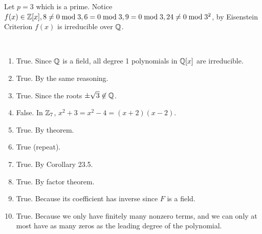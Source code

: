 \documentclass[class=article,crop=false]{standalone}
\begin{document}
\begin{problem}[23.19]
	Let $ p=3$ which is a prime. Notice  $ f(x) \in \mathbb{Z}[x], 8 \neq 0 \bmod 3, 6 = 0 \bmod 3, 9 = 0 \bmod 3, 24 \neq 0 \bmod 3^2$, by Eisenstein Criterion $ f(x)$ is irreducible over  $ \mathbb{Q}$.
\end{problem}

\begin{problem}[23.25]
	~\begin{enumerate}[label=\alph*)]
		\item True. Since $ \mathbb{Q}$ is a field, all degree 1 polynomials in $ \mathbb{Q}[x]$ are irreducible.
		\item True. By the same reasoning.
		\item True. Since the roots $\pm \sqrt{3} \not\in \mathbb{Q} $.
		\item False. In $ \mathbb{Z}_7$, $ x^2 + 3= x^2 -4 = (x+2)(x-2)$.
		\item True. By theorem.
		\item True (repeat).
		\item True. By Corollary 23.5.
		\item True. By factor theorem.
		\item True. Because its coefficient has inverse since $ F$ is a field.
		\item True. Because we only have finitely many nonzero terms, and we can only at most have as many zeros as the leading degree of the polynomial.
	\end{enumerate}
\end{problem}
\end{document}
